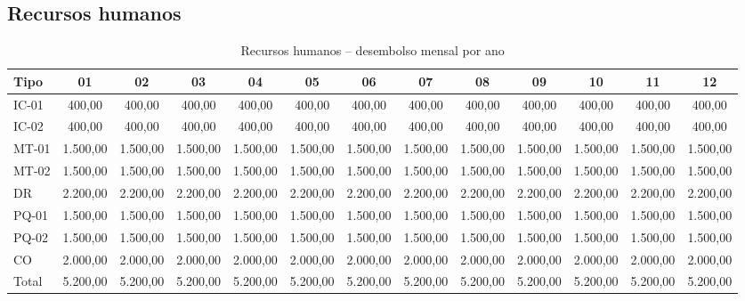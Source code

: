\subsection{Recursos humanos}
\begin{table}[!h]
\scriptsize
	\caption{Recursos humanos -- desembolso mensal por ano}
\begin{tabular}{ lcccccccccccc}
\toprule
   \rowcolor{lgray}
   Tipo      & 01      & 02      & 03      & 04      & 05      & 06      & 07      & 08      & 09      & 10      & 11      & 12      \\
\midrule
   IC-01     &   400,00&   400,00&   400,00&   400,00&   400,00&   400,00&   400,00&   400,00&   400,00&   400,00&   400,00&   400,00\\
   IC-02     &   400,00&   400,00&   400,00&   400,00&   400,00&   400,00&   400,00&   400,00&   400,00&   400,00&   400,00&   400,00\\
   MT-01     & 1.500,00& 1.500,00& 1.500,00& 1.500,00& 1.500,00& 1.500,00& 1.500,00& 1.500,00& 1.500,00& 1.500,00& 1.500,00& 1.500,00\\
   MT-02     & 1.500,00& 1.500,00& 1.500,00& 1.500,00& 1.500,00& 1.500,00& 1.500,00& 1.500,00& 1.500,00& 1.500,00& 1.500,00& 1.500,00\\
   DR        & 2.200,00& 2.200,00& 2.200,00& 2.200,00& 2.200,00& 2.200,00& 2.200,00& 2.200,00& 2.200,00& 2.200,00& 2.200,00& 2.200,00\\
   PQ-01     & 1.500,00& 1.500,00& 1.500,00& 1.500,00& 1.500,00& 1.500,00& 1.500,00& 1.500,00& 1.500,00& 1.500,00& 1.500,00& 1.500,00\\
   PQ-02     & 1.500,00& 1.500,00& 1.500,00& 1.500,00& 1.500,00& 1.500,00& 1.500,00& 1.500,00& 1.500,00& 1.500,00& 1.500,00& 1.500,00\\
   CO        & 2.000,00& 2.000,00& 2.000,00& 2.000,00& 2.000,00& 2.000,00& 2.000,00& 2.000,00& 2.000,00& 2.000,00& 2.000,00& 2.000,00\\
	\midrule
   Total     & 5.200,00& 5.200,00& 5.200,00& 5.200,00& 5.200,00& 5.200,00& 5.200,00& 5.200,00& 5.200,00& 5.200,00& 5.200,00& 5.200,00\\
   

\end{tabular}
\end{table}
